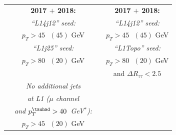 \begin{table}
\begin{tabular}{ c |c| c |c }
                                 & \small\textbf{2017 $+$ 2018:}   &                                 & \small \textbf{2017 $+$ 2018:}  \\
                                 & \small\textit{``L14j12'' seed:} &                                 & \small\textit{``L14j12'' seed:} \\
                                 & \small $p_T>45\text{ }(45)$ GeV &                                 & \small $p_T>45\text{ }(45)$ GeV \\[0.5em]
                                 & \small\textit{``L1j25'' seed:}  &                                 & \small\textit{``L1Topo'' seed:} \\
                                 & \small $p_T>80\text{ }(20)$ GeV &                                 & \small $p_T>80\text{ }(20)$ GeV \\
                                 &                                 &                                 & \small and $\Delta R_{\tau\tau}<2.5$\\[0.5em]
                                 & \small\textit{No additional jets} &                               &        \\
                                 & \small\textit{at L1 ($\mu$ channel} &                             &        \\
                                 & \small\textit{and $p_T^{\tauhad} >40$~GeV$^*$):} &                &        \\
                                 & \small $p_T>45\text{ }(20)$ GeV &                                 & \small                       \\\cmidrule[0.2pt]{1-4}


\end{tabular}
\end{table}
